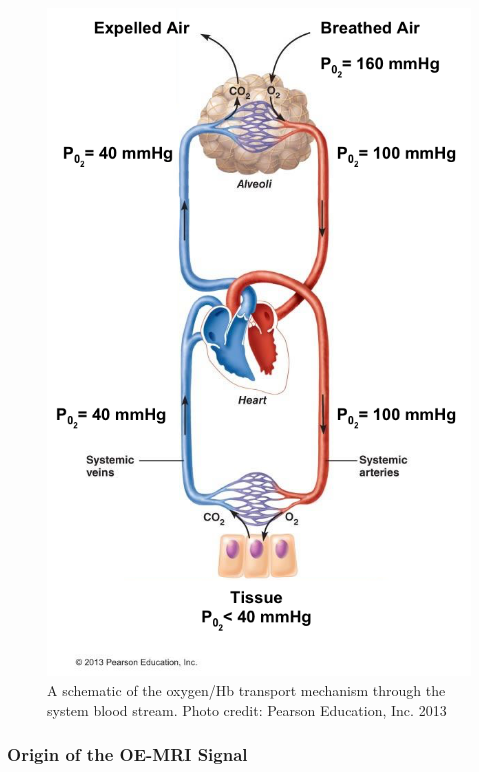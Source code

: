 	\begin{figure}
		\begin{center}
		\includegraphics[width=\textwidth]{./intro/intro-images/mmHg.png}
		\caption{A schematic of the oxygen/Hb transport mechanism through the system blood stream. Photo credit: Pearson Education, Inc. 2013}
		\label{mmhg}
		\end{center}
	\end{figure}

\subsubsection{Origin of the OE-MRI Signal}


